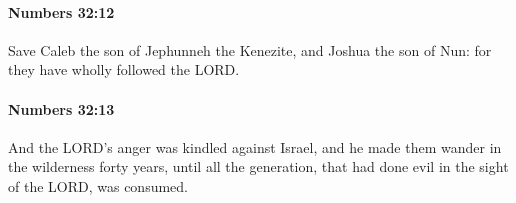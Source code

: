 		\paragraph{Numbers 32:12} %
			\label{NUMBERS-32-12}

			Save Caleb the son of Jephunneh the Kenezite, and Joshua the son of Nun: for they have wholly followed the LORD.


		\paragraph{Numbers 32:13} %
			\label{NUMBERS-32-13}

			And the LORD’s anger was kindled against Israel, and he made them wander in the wilderness forty years, until all the generation, that had done evil in the sight of the LORD, was consumed.


